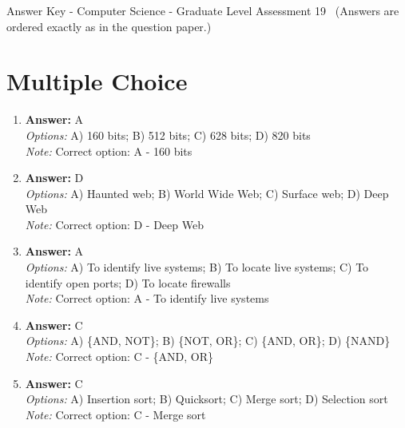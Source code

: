\documentclass[12pt]{article}
\begin{document}
\begin{center}
Answer Key - Computer Science - Graduate Level Assessment 19 \
\small (Answers are ordered exactly as in the question paper.)
\end{center}

\section*{Multiple Choice}
\begin{enumerate}[label=\arabic*.]
\item \textbf{Answer:} A
\\ \textit{Options:} A) 160 bits; B) 512 bits; C) 628 bits; D) 820 bits
\\ \textit{Note:} Correct option: A - 160 bits
\item \textbf{Answer:} D
\\ \textit{Options:} A) Haunted web; B) World Wide Web; C) Surface web; D) Deep Web
\\ \textit{Note:} Correct option: D - Deep Web
\item \textbf{Answer:} A
\\ \textit{Options:} A) To identify live systems; B) To locate live systems; C) To identify open ports; D) To locate firewalls
\\ \textit{Note:} Correct option: A - To identify live systems
\item \textbf{Answer:} C
\\ \textit{Options:} A) \{AND, NOT\}; B) \{NOT, OR\}; C) \{AND, OR\}; D) \{NAND\}
\\ \textit{Note:} Correct option: C - \{AND, OR\}
\item \textbf{Answer:} C
\\ \textit{Options:} A) Insertion sort; B) Quicksort; C) Merge sort; D) Selection sort
\\ \textit{Note:} Correct option: C - Merge sort
\end{enumerate}
\end{document}
